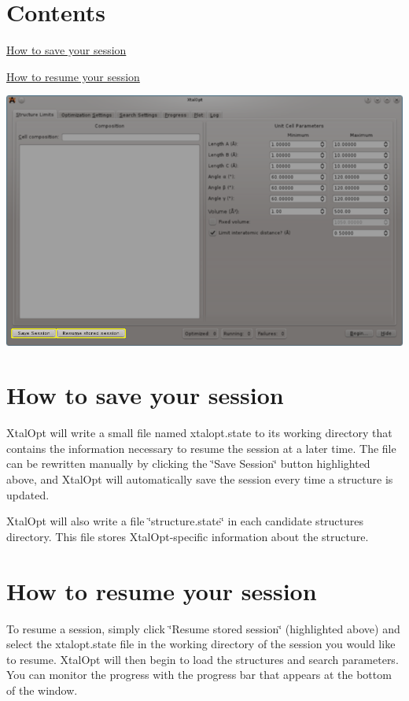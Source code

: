 \hypertarget{xo_saveresume_sr_contents}{}\section{Contents}\label{xo_saveresume_sr_contents}

\begin{DoxyItemize}
\item \hyperlink{xo_saveresume_sr_saving}{How to save your session}
\item \hyperlink{xo_saveresume_sr_resuming}{How to resume your session}
\end{DoxyItemize}

 
\begin{DoxyImageNoCaption}
  \mbox{\includegraphics[width=\textwidth]{xo-saveresume.png}}
\end{DoxyImageNoCaption}
\hypertarget{xo_saveresume_sr_saving}{}\section{How to save your session}\label{xo_saveresume_sr_saving}
Xtal\+Opt will write a small file named xtalopt.\+state to its working directory that contains the information necessary to resume the session at a later time. The file can be rewritten manually by clicking the \char`\"{}\+Save Session\char`\"{} button highlighted above, and Xtal\+Opt will automatically save the session every time a structure is updated.

Xtal\+Opt will also write a file \char`\"{}structure.\+state\char`\"{} in each candidate structure\textquotesingle{}s directory. This file stores Xtal\+Opt-\/specific information about the structure.\hypertarget{xo_saveresume_sr_resuming}{}\section{How to resume your session}\label{xo_saveresume_sr_resuming}
To resume a session, simply click \char`\"{}\+Resume stored session\char`\"{} (highlighted above) and select the xtalopt.\+state file in the working directory of the session you would like to resume. Xtal\+Opt will then begin to load the structures and search parameters. You can monitor the progress with the progress bar that appears at the bottom of the window.

